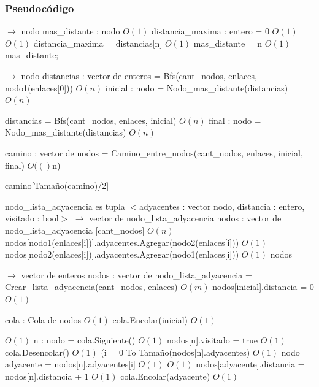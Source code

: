 \documentclass[a4paper, 10pt, twoside]{article}
\newenvironment{pseudo}[1][]{%
    \vspace{0.5em}%
    \begin{algorithmic}%
}
{%
    \end{algorithmic}%
    \vspace{0.5em}%
}
\newcommand{\Ode}[1]{\hfill $O(#1)$}
\begin{document}
\subsubsection{Pseudocódigo}
\begin{pseudo}
 $\rightarrow$ nodo
	\State mas\_distante : nodo													\Ode{1}
	\State distancia\_maxima : entero = 0										\Ode{1}
										\Ode{1}
			\State distancia\_maxima = distancias[n]								\Ode{1}
			\State mas\_distante = n												\Ode{1}
		\EndIf
	\EndFor
	\Return mas\_distante;
\EndProcedure

 $\rightarrow$ nodo
	\State distancias : vector de enteros = Bfs(cant\_nodos, enlaces, nodo1(enlaces[0])) \Ode{n}
	\State inicial : nodo = Nodo\_mas\_distante(distancias)						\Ode{n}

	\State distancias = Bfs(cant\_nodos, enlaces, inicial)						\Ode{n}
	\State final : nodo = Nodo\_mas\_distante(distancias)						\Ode{n}

	\State camino : vector de nodos = Camino\_entre\_nodos(cant\_nodos, enlaces, inicial, final) \Ode(n)
	
	\Return camino[Tamaño(camino)/2]
\EndProcedure

nodo\_lista\_adyacencia es tupla $<$adyacentes : vector nodo, distancia : entero, visitado : bool$>$
 $\rightarrow$ vector de nodo\_lista\_adyacencia
	\State nodos : vector de nodo\_lista\_adyacencia [cant\_nodos]				\Ode{n}
		\State nodos[nodo1(enlaces[i])].adyacentes.Agregar(nodo2(enlaces[i]))	\Ode{1}
		\State nodos[nodo2(enlaces[i])].adyacentes.Agregar(nodo1(enlaces[i]))	\Ode{1}
	 \EndFor
	\Return nodos
\EndProcedure

 $\rightarrow$ vector de enteros
	\State nodos : vector de nodo\_lista\_adyacencia = Crear\_lista\_adyacencia(cant\_nodos, enlaces) \Ode{m}
	\State nodos[inicial].distancia = 0											\Ode{1}

	\State cola : Cola de nodos													\Ode{1}
	\State cola.Encolar(inicial)												\Ode{1}
	
															\Ode{1}
		\State n : nodo = cola.Siguiente()										\Ode{1}
		\State nodos[n].visitado = true											\Ode{1}
		\State cola.Desencolar()												\Ode{1}
		\For({i = 0 To Tamaño(nodos[n].adyacentes)}								\Ode{1}
			\State nodo adyacente = nodos[n].adyacentes[i]						\Ode{1}
											\Ode{1}
				\State nodos[adyacente].distancia = nodos[n].distancia + 1		\Ode{1}
				\State cola.Encolar(adyacente)									\Ode{1}
			\EndIf
		\EndFor
	\EndWhile


\end{pseudo}
\end{document}
